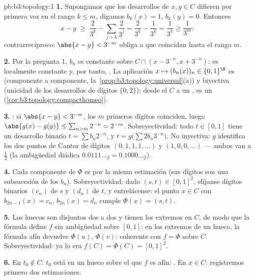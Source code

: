 \begin{solution}{pb:b3:topology:1}
\textbf{1.} Supongamos que los desarrollos de $x, y \in C$ difieren por
primera vez en el rango $k \leq m$, digamos $b_k(x) = 1$, $b_k(y) = 0$.
Entonces
\[
x - y \;\geq\; \frac{2}{3^k} - \sum_{j > k}\frac{2}{3^j}
= \frac{2}{3^k} - \frac{1}{3^k} = \frac1{3^k} \geq \frac1{3^m}:
\]
contrarrecíproco: $\abs{x - y} < 3^{-m}$ obliga a que coincidan hasta el
rango $m$.

\textbf{2.} Por la pregunta 1, $b_n$ es constante sobre $C \cap (x -
3^{-n}, x + 3^{-n})$: es localmente constante y, por tanto,
. La aplicación
$x \mapsto (b_n(x))_n \in \{0,1\}^\N$ es
 (componente a componente,
la~\cref{prop:b3:topology:universal}(a)) y biyectiva (unicidad de los
desarrollos de dígitos $\{0,2\}$); desde el
 $C$ a un
, es un
(\cref{cor:b3:topology:compacthomeo}).

\textbf{3.} : si
$\abs{x - y} < 3^{-m}$, los $m$ primeros dígitos coinciden, luego
$\abs{g(x) - g(y)} \leq \sum_{n > m}2^{-n}
= 2^{-m}$. Sobreyectividad: todo $t \in [0,1]$ tiene un desarrollo
binario $t = \sum b_n2^{-n}$, y $t = g\bigl(\sum
2b_n3^{-n}\bigr)$. No inyectiva: $g$ identifica los dos puntos de Cantor
de dígitos $(0,1,1,1,\dots)$ y $(1,0,0,\dots)$ --- ambos van a $\frac12$
(la ambigüedad diádica $0.0111\ldots_2 =
0.1000\ldots_2$).

\textbf{4.} Cada componente de $\Phi$ es
 por la misma estimación
(sus dígitos son una subsucesión de los $b_n$). Sobreyectividad: dado
$(s, t) \in [0,1]^2$, elíjanse dígitos binarios $(c_n)$ de $s$ y $(d_n)$
de $t$, y entrelácense: el punto $x
\in C$ con $b_{2n-1}(x) = c_n$, $b_{2n}(x) = d_n$ cumple
$\Phi(x) = (s,t)$.

\textbf{5.} Los huecos son disjuntos dos a dos y tienen los extremos en
$C$, de modo que la fórmula define $f$ sin ambigüedad sobre $[0,1]$; en
los extremos de un hueco, la fórmula afín devuelve $\Phi(u)$, $\Phi(v)$:
coherente con $f = \Phi$ sobre $C$. Sobreyectividad: ya lo era
$f(C) = \Phi(C) = [0,1]^2$.

\textbf{6.} En $t_0 \notin C$: $t_0$ está en un hueco  sobre el
que $f$ es afín: . En
$x \in C$: registremos primero dos estimaciones.


\end{solution}
